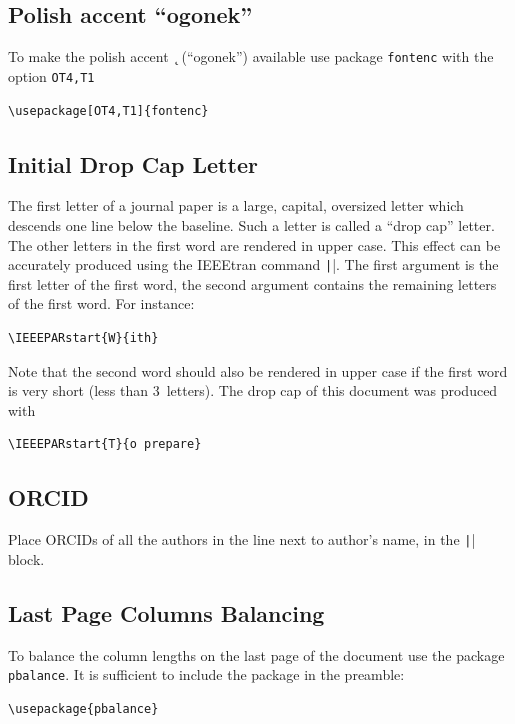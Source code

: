\documentclass[conference]{IEEEtran}
\begin{document}
\subsection{Polish accent ``ogonek''}
To make the polish accent {\k \ } (``ogonek'') available use package \verb|fontenc| with the option \verb|OT4,T1|
\begin{verbatim}
\usepackage[OT4,T1]{fontenc}
\end{verbatim}

\subsection{Initial Drop Cap Letter}
 The first letter of a journal paper is a large, capital, oversized
letter which descends one line below the baseline. Such a
letter is called a ``drop cap'' letter. The other letters in the first
word are rendered in upper case. This effect can be accurately
produced using the IEEEtran command \texttt|\IEEEPARstart{}{}|. The first argument is the first letter of the first word, the
second argument contains the remaining letters of the first
word. For instance:
\begin{verbatim}
\IEEEPARstart{W}{ith}
\end{verbatim}

Note that the second word should also be rendered  in
upper case if the first word is very short (less than 3~letters). The drop cap of this document was produced with
\begin{verbatim}
\IEEEPARstart{T}{o prepare}
\end{verbatim}

\subsection{ORCID}
Place ORCIDs of all the authors in the line next to author's name, in the \texttt|\IEEEauthorblockA{}| block.

\subsection{Last Page Columns Balancing}
 To balance the column lengths on the last page of the document use the package \verb|pbalance|. It is sufficient to include the package in the preamble:
\begin{verbatim}
\usepackage{pbalance}
\end{verbatim}
\end{document}
